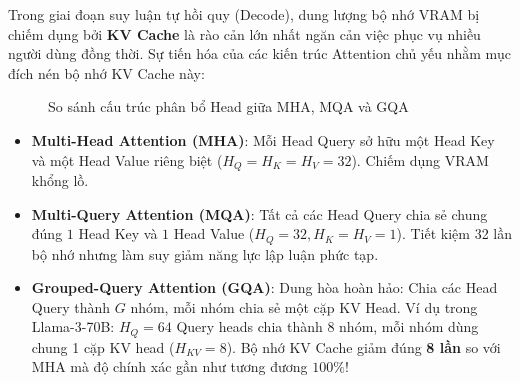Trong giai đoạn suy luận tự hồi quy (Decode), dung lượng bộ nhớ VRAM bị chiếm dụng bởi \textbf{KV Cache} là rào cản lớn nhất ngăn cản việc phục vụ nhiều người dùng đồng thời. Sự tiến hóa của các kiến trúc Attention chủ yếu nhằm mục đích nén bộ nhớ KV Cache này:

\begin{figure}[htbp]
\centering
{}
\caption{So sánh cấu trúc phân bổ Head giữa MHA, MQA và GQA}
\label{fig:mha-mqa-gqa-comparison}
\end{figure}

\begin{itemize}
  \item \textbf{Multi-Head Attention (MHA)}: Mỗi Head Query sở hữu một Head Key và một Head Value riêng biệt ($H_Q = H_K = H_V = 32$). Chiếm dụng VRAM khổng lồ.
  \item \textbf{Multi-Query Attention (MQA)}: Tất cả các Head Query chia sẻ chung đúng $1$ Head Key và $1$ Head Value ($H_Q = 32, H_K = H_V = 1$). Tiết kiệm 32 lần bộ nhớ nhưng làm suy giảm năng lực lập luận phức tạp.
  \item \textbf{Grouped-Query Attention (GQA)}: Dung hòa hoàn hảo: Chia các Head Query thành $G$ nhóm, mỗi nhóm chia sẻ một cặp KV Head. Ví dụ trong Llama-3-70B: $H_Q = 64$ Query heads chia thành 8 nhóm, mỗi nhóm dùng chung 1 cặp KV head ($H_{KV} = 8$). Bộ nhớ KV Cache giảm đúng \textbf{8 lần} so với MHA mà độ chính xác gần như tương đương $100\%$!
\end{itemize}

